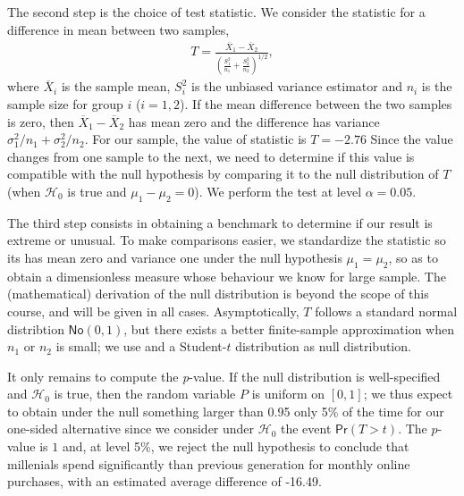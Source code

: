 \documentclass[
  11pt,
  letterpaper,
]{book}
\theoremstyle{definition}
\theoremstyle{definition}
\theoremstyle{definition}
\theoremstyle{definition}
\theoremstyle{remark}
\begin{document}
The second step is the choice of test statistic. We consider the \citet{Welch:1947} statistic for a difference in mean between two samples,
\begin{align*}
T = \frac{\overline{X}_1 - \overline{X}_2}{\left(\frac{S_1^2}{n_1}+\frac{S_2^2}{n_2} \right)^{1/2}}, \end{align*}
where \(\overline{X}_i\) is the sample mean, \(S_i^2\) is the unbiased variance estimator and \(n_i\) is the sample size for group \(i\) (\(i=1, 2\)). If the mean difference between the two samples is zero, then \(\overline{X}_1-\overline{X}_2\) has mean zero and the difference has variance \(\sigma^2_1/n_1+\sigma^2_2/n_2\). For our sample, the value of statistic is \(T=-2.76\) Since the value changes from one sample to the next, we need to determine if this value is compatible with the null hypothesis by comparing it to the null distribution of \(T\) (when \(\mathscr{H}_0\) is true and \(\mu_1-\mu_2=0\)). We perform the test at level \(\alpha=0.05\).

The third step consists in obtaining a benchmark to determine if our result is extreme or unusual. To make comparisons easier, we standardize the statistic so its has mean zero and variance one under the null hypothesis \(\mu_1=\mu_2\), so as to obtain a dimensionless measure whose behaviour we know for large sample. The (mathematical) derivation of the null distribution is beyond the scope of this course, and will be given in all cases. Asymptotically, \(T\) follows a standard normal distribtion \(\mathsf{No}(0, 1)\), but there exists a better finite-sample approximation when \(n_1\) or \(n_2\) is small; we use \citet{Satterthwaite:1946} and a Student-\(t\) distribution as null distribution.

It only remains to compute the \emph{p}-value. If the null distribution is well-specified and \(\mathscr{H}_0\) is true, then the random variable \(P\) is uniform on \([0, 1]\); we thus expect to obtain under the null something larger than 0.95 only 5\% of the time for our one-sided alternative since we consider under \(\mathscr{H}_0\) the event \(\mathsf{Pr}(T > t)\). The \(p\)-value is \(1\) and, at level 5\%, we reject the null hypothesis to conclude that millenials spend significantly than previous generation for monthly online purchases, with an estimated average difference of -16.49.
\end{document}
